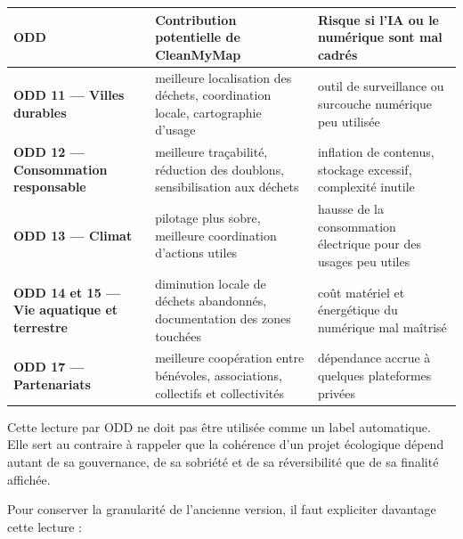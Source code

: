 \documentclass[
  10pt,
  a4paper,
  DIV=11,
  numbers=noendperiod,
  oneside]{scrreprt}
\newcounter{none} %
\let\oldtextbf\textbf
\renewcommand{\textbf}[1]{\oldtextbf{\textcolor{cmmnavy}{#1}}}
\begin{document}
{\def\LTcaptype{none} %
\begin{longtable}[]{@{}
  >{\raggedright\arraybackslash}p{}
  >{\raggedright\arraybackslash}p{}
  >{\raggedright\arraybackslash}p{}@{}}
\toprule\noalign{}
\begin{minipage}[b]{\linewidth}\raggedright
ODD
\end{minipage} & \begin{minipage}[b]{\linewidth}\raggedright
Contribution potentielle de CleanMyMap
\end{minipage} & \begin{minipage}[b]{\linewidth}\raggedright
Risque si l'IA ou le numérique sont mal cadrés
\end{minipage} \\
\midrule\noalign{}
\endhead
\bottomrule\noalign{}
\endlastfoot
\textbf{ODD 11 --- Villes durables} & meilleure localisation des
déchets, coordination locale, cartographie d'usage & outil de
surveillance ou surcouche numérique peu utilisée \\
\textbf{ODD 12 --- Consommation responsable} & meilleure traçabilité,
réduction des doublons, sensibilisation aux déchets & inflation de
contenus, stockage excessif, complexité inutile \\
\textbf{ODD 13 --- Climat} & pilotage plus sobre, meilleure coordination
d'actions utiles & hausse de la consommation électrique pour des usages
peu utiles \\
\textbf{ODD 14 et 15 --- Vie aquatique et terrestre} & diminution locale
de déchets abandonnés, documentation des zones touchées & coût matériel
et énergétique du numérique mal maîtrisé \\
\textbf{ODD 17 --- Partenariats} & meilleure coopération entre
bénévoles, associations, collectifs et collectivités & dépendance accrue
à quelques plateformes privées \\
\end{longtable}
}

Cette lecture par ODD ne doit pas être utilisée comme un label
automatique. Elle sert au contraire à rappeler que la cohérence d'un
projet écologique dépend autant de sa gouvernance, de sa sobriété et de
sa réversibilité que de sa finalité affichée.

Pour conserver la granularité de l'ancienne version, il faut expliciter
davantage cette lecture :
\end{document}
